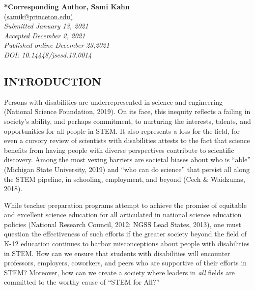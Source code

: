 \documentclass[11.5pt]{sig-alternate}
\begin{document}

\textbf{*Corresponding Author, Sami Kahn}\\
\href{mailto: samik@princeton.edu }{(samik@princeton.edu)}\\
\textit{Submitted January 13, 2021 }\\
\textit{Accepted December 2, 2021}\\
\textit{Published online December 23,2021}\\
\textit{DOI: 10.14448/jsesd.13.0014}\\

\clearpage
\begin{large}
\section*{INTRODUCTION}

Persons with disabilities are underrepresented in science and engineering (National Science Foundation, 2019).  On its face, this inequity reflects a failing in society’s ability, and perhaps commitment, to nurturing the interests, talents, and opportunities for all people in STEM.  It also represents a loss for the field, for even a cursory review of scientists with disabilities attests to the fact that science benefits from having people with diverse perspectives contribute to scientific discovery.  Among the most vexing barriers are societal biases about who is “able” (Michigan State University, 2019) and “who can do science” that persist all along the STEM pipeline, in schooling, employment, and beyond (Cech \& Waidzunas, 2018).

While teacher preparation programs attempt to achieve the promise of equitable and excellent science education for all articulated in national science education policies (National Research Council, 2012; NGSS Lead States, 2013), one must question the effectiveness of such efforts if the greater society beyond the field of K-12 education continues to harbor misconceptions about people with disabilities in STEM.  How can we ensure that students with disabilities will encounter professors, employers, coworkers, and peers who are supportive of their efforts in STEM?  Moreover, how can we create a society where leaders in \textit{all} fields are committed to the worthy cause of “STEM for All?” 


\end{large}
\end{document}

